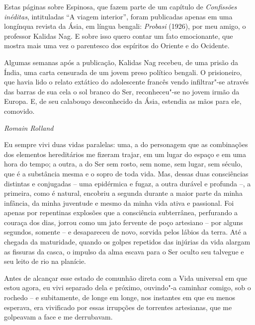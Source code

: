 \pagebreak
\thispagestyle{empty}

Estas páginas sobre Espinosa, que fazem parte de um capítulo de
\emph{Confissões inéditas}, intituladas ``A viagem interior'', foram
publicadas apenas em uma longínqua revista da Ásia, em língua bengali:
\emph{Probasi} (1926), por meu amigo, o professor Kalidas Nag. E sobre
isso quero contar um fato emocionante, que mostra mais uma vez o
parentesco dos espíritos do Oriente e do Ocidente.

Algumas semanas após a publicação, Kalidas Nag recebeu, de uma prisão da
Índia, uma carta censurada de um jovem preso político bengali. O
prisioneiro, que havia lido o relato extático do adolescente francês
vendo infiltrar"-se através das barras de sua cela o sol branco do Ser,
reconheceu"-se no jovem irmão da Europa. E, de seu calabouço desconhecido
da Ásia, estendia as mãos para ele, comovido.

\begin{flushright}
\emph{Romain Rolland}
\end{flushright}

\pagebreak
\thispagestyle{empty}
\movetooddpage

Eu sempre vivi duas vidas paralelas: uma, a do personagem que as
combinações dos elementos hereditários me fizeram trajar, em um lugar do
espaço e em uma hora do tempo; a outra, a do Ser sem rosto, sem nome,
sem lugar, sem século, que é a substância mesma e o sopro de toda vida.
Mas, dessas duas consciências distintas e conjugadas -- uma epidérmica e
fugaz, a outra durável e profunda --, a primeira, como é natural,
encobriu a segunda durante a maior parte da minha infância, da minha
juventude e mesmo da minha vida ativa e passional. Foi apenas por
repentinas explosões que a consciência subterrânea, perfurando a couraça
dos dias, jorrou como um jato fervente de poço artesiano -- por alguns
segundos, somente -- e desapareceu de novo, sorvida pelos lábios da
terra. Até a chegada da maturidade, quando os golpes repetidos das
injúrias da vida alargam as fissuras da casca, o impulso da alma escava
para o Ser oculto seu talvegue e seu leito de rio na planície.

Antes de alcançar esse estado de comunhão direta com a Vida universal em
que estou agora, eu vivi separado dela e próximo, ouvindo"-a caminhar
comigo, sob o rochedo -- e subitamente, de longe em longe, nos instantes
em que eu menos esperava, era vivificado por essas irrupções de
torrentes artesianas, que me golpeavam a face e me derrubavam.

